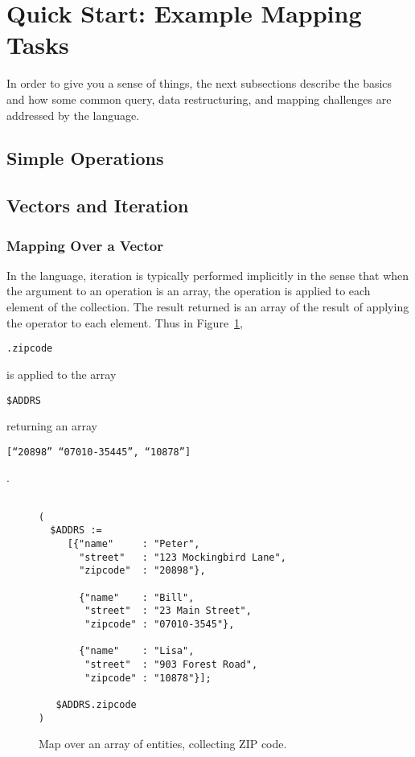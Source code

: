 \documentclass[9pt,letterpaper]{article}
\newcommand{\stt}[1]{\begin{footnotesize}\texttt{#1}\end{footnotesize}}
\begin{document}
\section{Quick Start: Example Mapping Tasks}

In order to give you a sense of things, the next subsections describe the basics and how some common query, data restructuring, and mapping challenges are addressed by the language.

\subsection{Simple Operations}

\subsection{Vectors and Iteration}

\subsubsection{Mapping Over a Vector}
In the language, iteration is typically performed implicitly in the sense that when the argument to an operation is an array, the operation is applied to each element of the collection.
The result returned is an array of the result of applying the operator to each element.
Thus in Figure~\ref{code:simple-map}, \stt{.zipcode} is applied to the array \stt{\$ADDRS} returning  an array \stt{[``20898'' ``07010-35445'', ``10878'']}.

\lstset{
    basicstyle=\footnotesize\ttfamily
  }

\begin{figure}[H]
\caption{Map over an array of entities, collecting ZIP code.}
 \label{code:simple-map}
\begin{lstlisting}[basicstyle=\ttfamily\scriptsize]

(
  $ADDRS :=
     [{"name"     : "Peter",
       "street"   : "123 Mockingbird Lane",
       "zipcode"  : "20898"},

       {"name"    : "Bill",
        "street"  : "23 Main Street",
        "zipcode" : "07010-3545"},

       {"name"    : "Lisa",
        "street"  : "903 Forest Road",
        "zipcode" : "10878"}];

   $ADDRS.zipcode
)

\end{lstlisting}
\end{figure}
\end{document}
